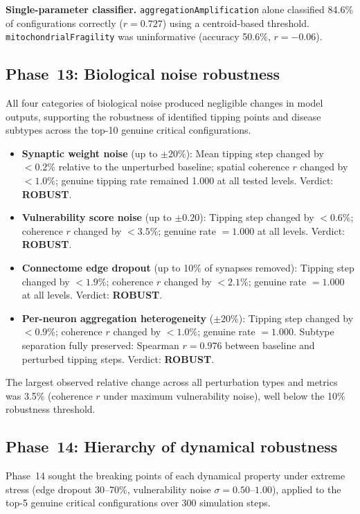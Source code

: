 \documentclass[12pt,a4paper]{article}
\begin{document}
\textbf{Single-parameter classifier.} \texttt{aggregationAmplification} alone classified 84.6\%
of configurations correctly ($r = 0.727$) using a centroid-based threshold.
\texttt{mitochondrialFragility} was uninformative (accuracy 50.6\%, $r = -0.06$).

\subsection{Phase~13: Biological noise robustness}

All four categories of biological noise produced negligible changes in model outputs, supporting
the robustness of identified tipping points and disease subtypes across the top-10 genuine
critical configurations.

\begin{itemize}
\item \textbf{Synaptic weight noise} (up to $\pm 20\%$): Mean tipping step changed by $< 0.2\%$
relative to the unperturbed baseline; spatial coherence $r$ changed by $< 1.0\%$; genuine
tipping rate remained 1.000 at all tested levels. Verdict: \textbf{ROBUST}.
\item \textbf{Vulnerability score noise} (up to $\pm 0.20$): Tipping step changed by $< 0.6\%$;
coherence $r$ changed by $< 3.5\%$; genuine rate $= 1.000$ at all levels. Verdict:
\textbf{ROBUST}.
\item \textbf{Connectome edge dropout} (up to 10\% of synapses removed): Tipping step changed
by $< 1.9\%$; coherence $r$ changed by $< 2.1\%$; genuine rate $= 1.000$ at all levels.
Verdict: \textbf{ROBUST}.
\item \textbf{Per-neuron aggregation heterogeneity} ($\pm 20\%$): Tipping step changed by
$< 0.9\%$; coherence $r$ changed by $< 1.0\%$; genuine rate $= 1.000$. Subtype separation
fully preserved: Spearman $r = 0.976$ between baseline and perturbed tipping steps. Verdict:
\textbf{ROBUST}.
\end{itemize}

The largest observed relative change across all perturbation types and metrics was 3.5\% (coherence
$r$ under maximum vulnerability noise), well below the 10\% robustness threshold.

\subsection{Phase~14: Hierarchy of dynamical robustness}

Phase~14 sought the breaking points of each dynamical property under extreme stress (edge
dropout 30--70\%, vulnerability noise $\sigma = 0.50$--$1.00$), applied to the top-5 genuine
critical configurations over 300 simulation steps.
\end{document}
